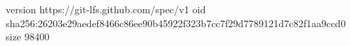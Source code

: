 version https://git-lfs.github.com/spec/v1
oid sha256:26203e29aedef8466c86ee90b45922f323b7cc7f29d7789121d7c82f1aa9ccd0
size 98400
